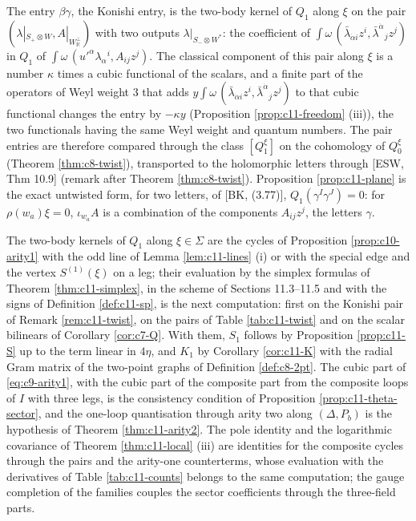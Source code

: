 \begin{remark}
The entry $\beta\gamma$, the Konishi entry, is the two-body kernel of $Q_1$ along $\xi$ on the pair $(\lambda|_{S_+\otimes W},A|_{W_{\mathbb R}^\perp})$ with two outputs $\lambda|_{S_-\otimes W^*}$: the coefficient of $\int\omega\,(\bar\lambda_{\dot\alpha i}z^i,\bar\lambda^{\dot\alpha}{}_jz^j)$ in $Q_1$ of $\int\omega\,(u'^\alpha\lambda_\alpha{}^i,A_{ij}z^j)$. The classical component of this pair along $\xi$ is a number $\kappa$ times a cubic functional of the scalars, and a finite part of the operators of Weyl weight $3$ that adds $y\int\omega\,(\bar\lambda_{\dot\alpha i}z^i,\bar\lambda^{\dot\alpha}{}_jz^j)$ to that cubic functional changes the entry by $-\kappa y$ (Proposition \ref{prop:c11-freedom} (iii)), the two functionals having the same Weyl weight and quantum numbers. The pair entries are therefore compared through the class $[Q^\xi_1]$ on the cohomology of $Q^\xi_0$ (Theorem \ref{thm:c8-twist}), transported to the holomorphic letters through [ESW, Thm 10.9] (remark after Theorem \ref{thm:c8-twist}). Proposition \ref{prop:c11-plane} is the exact untwisted form, for two letters, of [BK, (3.77)], $Q_1(\gamma^I\gamma^J)=0$: for $\rho(w_a)\xi=0$, $\iota_{w_a}A$ is a combination of the components $A_{ij}z^j$, the letters $\gamma$.
\end{remark}

\begin{remark}
\label{rem:c11-next}
The two-body kernels of $Q_1$ along $\xi\in\Sigma$ are the cycles of Proposition \ref{prop:c10-arity1} with the odd line of Lemma \ref{lem:c11-lines} (i) or with the special edge and the vertex $S^{(1)}(\xi)$ on a leg; their evaluation by the simplex formulas of Theorem \ref{thm:c11-simplex}, in the scheme of Sections 11.3--11.5 and with the signs of Definition \ref{def:c11-sp}, is the next computation: first on the Konishi pair of Remark \ref{rem:c11-twist}, on the pairs of Table \ref{tab:c11-twist} and on the scalar bilinears of Corollary \ref{cor:c7-Q}. With them, $S_1$ follows by Proposition \ref{prop:c11-S} up to the term linear in $4\eta$, and $K_1$ by Corollary \ref{cor:c11-K} with the radial Gram matrix of the two-point graphs of Definition \ref{def:c8-2pt}. The cubic part of \eqref{eq:c9-arity1}, with the cubic part of the composite part from the composite loops of $I$ with three legs, is the consistency condition of Proposition \ref{prop:c11-theta-sector}, and the one-loop quantisation through arity two along $(\Delta,P_b)$ is the hypothesis of Theorem \ref{thm:c11-arity2}. The pole identity and the logarithmic covariance of Theorem \ref{thm:c11-local} (iii) are identities for the composite cycles through the pairs and the arity-one counterterms, whose evaluation with the derivatives of Table \ref{tab:c11-counts} belongs to the same computation; the gauge completion of the families couples the sector coefficients through the three-field parts.
\end{remark}

